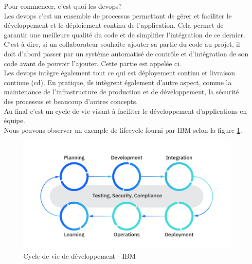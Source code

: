 \documentclass[
    iai, %
    il, %
]{heig-tb}
\begin{document}
Pour commencer, c'est quoi les \Gls{devops}?\\
Les \Gls{devops} c'est un ensemble de processus permettant de gérer et faciliter le développement et le déploiement continu de l'application. Cela permet de garantir une meilleure qualité du code et de simplifier l'intégration de ce dernier. C'est-à-dire, si un collaborateur souhaite ajouter sa partie du code au projet, il doit d'abord passer par un système automatisé de contrôle et d'intégration de son code avant de pouvoir l'ajouter. Cette partie est appelée \Gls{ci}.\\
Les \Gls{devops} intègre également tout ce qui est déployement continu et livraison continue (\Gls{cd}).
En pratique, ils intègrent également d'autre aspect, comme la maintenance de l'infrastructure de
production et de développement, la sécurité des processus et beaucoup d'autres concepts.\\
Au final c'est un cycle de vie visant à faciliter le développement d'applications en équipe.\\
Nous peuvons observer un exemple de lifecycle fourni par IBM selon la figure \ref{devops-lifecycle}.

\begin{center}
    \begin{figure}[H]
        \includegraphics[width=\textwidth]{./assets/figures/ibm-devops-lifecycle.png}
        \caption[Cycle de vie de développement]{Cycle de vie de développement - IBM} \label{devops-lifecycle}
    \end{figure}
\end{center}
\end{document}
